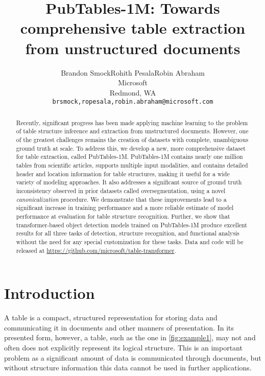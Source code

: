 \documentclass[10pt,twocolumn,letterpaper]{article}
\begin{document}
\title{PubTables-1M: Towards comprehensive table extraction from unstructured documents}

\author{%
  Brandon Smock\qquad Rohith Pesala\qquad Robin Abraham\\
  Microsoft\\
  Redmond, WA \\
  {\tt\small brsmock,ropesala,robin.abraham@microsoft.com} \\
}

\maketitle

\begin{abstract}
Recently, significant progress has been made applying machine learning to the problem of table structure inference and extraction from unstructured documents.
However, one of the greatest challenges remains the creation of datasets with complete, unambiguous ground truth at scale.
To address this, we develop a new, more comprehensive dataset for table extraction, called PubTables-1M.
PubTables-1M contains nearly one million tables from scientific articles, supports multiple input modalities, and contains detailed header and location information for table structures, making it useful for a wide variety of modeling approaches.
It also addresses a significant source of ground truth inconsistency observed in prior datasets called oversegmentation, using a novel \emph{canonicalization} procedure.
We demonstrate that these improvements lead to a significant increase in training performance and a more reliable estimate of model performance at evaluation for table structure recognition.
Further, we show that transformer-based object detection models trained on PubTables-1M produce excellent results for all three tasks of detection, structure recognition, and functional analysis without the need for any special customization for these tasks.
Data and code will be released at \url{https://github.com/microsoft/table-transformer}.
\end{abstract}

\section{Introduction}

A table is a compact, structured representation for storing data and communicating it in documents and other manners of presentation.
In its presented form, however, a table, such as the one in \cref{fig:example1}, may not and often does not explicitly represent its logical structure.
This is an important problem as a significant amount of data is communicated through documents, but without structure information this data cannot be used in further applications.
\end{document}
